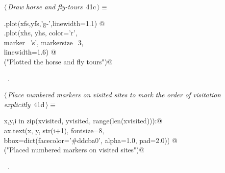\documentclass[11.5pt]{report}
\begin{document}
\begin{flushleft} \small
\begin{minipage}{\linewidth}\label{scrap56}\raggedright\small
{} $\langle\,${\itshape Draw horse and fly-tours}\nobreak\ {\footnotesize {41c}}$\,\rangle\equiv$
\vspace{-1ex}
\begin{list}{}{} \item
\mbox{}\verb@ax.plot(xfs,yfs,'g-',linewidth=1.1)  @\\
\mbox{}\verb@ax.plot(xhs, yhs, color='r', \@\\
\mbox{}\verb@        marker='s', markersize=3, \@\\
\mbox{}\verb@        linewidth=1.6) @\\
\mbox{}\verb@debug("Plotted the horse and fly tours")@\\
\mbox{}\verb@@{\NWsep}
\end{list}
\vspace{-1.5ex}
\footnotesize
\begin{list}{}{\setlength{\itemsep}{-\parsep}\setlength{\itemindent}{-\leftmargin}}
\item \NWtxtMacroRefIn\ .

\item{}
\end{list}
\end{minipage}\vspace{4ex}
\end{flushleft}

\begin{flushleft} \small\label{scrap57}\raggedright\small
{} $\langle\,${\itshape Place numbered markers on visited sites to mark the order of visitation explicitly}\nobreak\ {\footnotesize {41d}}$\,\rangle\equiv$
\vspace{-1ex}
\begin{list}{}{} \item
\mbox{}\verb@for x,y,i in zip(xvisited, yvisited, range(len(xvisited))):@\\
\mbox{}\verb@     ax.text(x, y, str(i+1),  fontsize=8, \@\\
\mbox{}\verb@             bbox=dict(facecolor='#ddcba0', alpha=1.0, pad=2.0)) @\\
\mbox{}\verb@debug("Placed numbered markers on visited sites")@\\
\mbox{}\verb@@{\NWsep}
\end{list}
\vspace{-1.5ex}
\footnotesize
\begin{list}{}{\setlength{\itemsep}{-\parsep}\setlength{\itemindent}{-\leftmargin}}
\item \NWtxtMacroRefIn\ .

\item{}
\end{list}
\vspace{4ex}
\end{flushleft}
\end{document}
